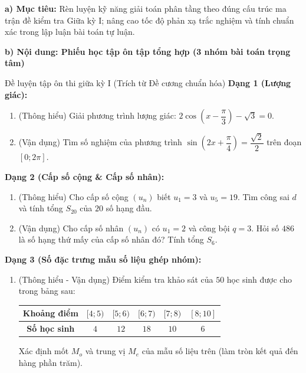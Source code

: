 \documentclass[12pt, a4paper]{article}
\begin{document}
\noindent \textbf{a) Mục tiêu:}
Rèn luyện kỹ năng giải toán phân tầng theo đúng cấu trúc ma trận đề kiểm tra Giữa kỳ I; nâng cao tốc độ phản xạ trắc nghiệm và tính chuẩn xác trong lập luận bài toán tự luận.

\noindent \textbf{b) Nội dung: Phiếu học tập ôn tập tổng hợp (3 nhóm bài toán trọng tâm)}
\begin{pedabox}{Đề luyện tập ôn thi giữa kỳ I (Trích từ Đề cương chuẩn hóa)}
\textbf{Dạng 1 (Lượng giác):}
\begin{enumerate}[leftmargin=0.6cm]
    \item[1.1.] (Thông hiểu) Giải phương trình lượng giác: $2\cos\left(x - \dfrac{\pi}{3}\right) - \sqrt{3} = 0$.
    \item[1.2.] (Vận dụng) Tìm số nghiệm của phương trình $\sin\left(2x + \dfrac{\pi}{4}\right) = \dfrac{\sqrt{2}}{2}$ trên đoạn $[0; 2\pi]$.
\end{enumerate}
\textbf{Dạng 2 (Cấp số cộng \& Cấp số nhân):}
\begin{enumerate}[leftmargin=0.6cm]
    \item[2.1.] (Thông hiểu) Cho cấp số cộng $(u_n)$ biết $u_1 = 3$ và $u_5 = 19$. Tìm công sai $d$ và tính tổng $S_{20}$ của $20$ số hạng đầu.
    \item[2.2.] (Vận dụng) Cho cấp số nhân $(u_n)$ có $u_1 = 2$ và công bội $q = 3$. Hỏi số $486$ là số hạng thứ mấy của cấp số nhân đó? Tính tổng $S_6$.
\end{enumerate}
\textbf{Dạng 3 (Số đặc trưng mẫu số liệu ghép nhóm):}
\begin{enumerate}[leftmargin=0.6cm]
    \item[3.1.] (Thông hiểu - Vận dụng) Điểm kiểm tra khảo sát của $50$ học sinh được cho trong bảng sau:
    \begin{center}
    \small
    \begin{tabular}{|c|c|c|c|c|c|}
    \hline
    \textbf{Khoảng điểm} & $[4; 5)$ & $[5; 6)$ & $[6; 7)$ & $[7; 8)$ & $[8; 10]$ \\ \hline
    \textbf{Số học sinh} & $4$ & $12$ & $18$ & $10$ & $6$ \\ \hline
    \end{tabular}
    \end{center}
    Xác định mốt $M_o$ và trung vị $M_e$ của mẫu số liệu trên (làm tròn kết quả đến hàng phần trăm).
\end{enumerate}
\end{pedabox}
\end{document}
